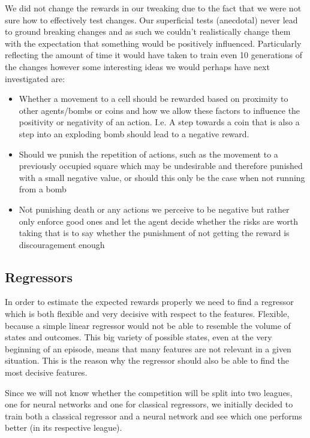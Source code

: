 	We did not change the rewards in our tweaking due to the fact that we were not sure how to effectively test changes. Our superficial tests (anecdotal) never lead to ground breaking changes and as such we couldn't realistically change them with the expectation that something would be positively influenced. Particularly reflecting the amount of time it would have taken to train even 10 generations of the changes however some interesting ideas we would perhaps have next investigated are:
	\begin{itemize}
		\item Whether a movement to a cell should be rewarded based on proximity to other agents/bombs or coins and how we allow these factors to influence the positivity or negativity of an action. I.e. A step towards a coin that is also a step into an exploding bomb should lead to a negative reward.
		\item Should we punish the repetition of actions, such as the movement to a previously occupied square which may be undesirable and therefore punished with a small negative value, or should this only be the case when not running from a bomb
		\item Not punishing death or any actions we perceive to be negative but rather only enforce good ones and let the agent decide whether the risks are worth taking that is to say whether the punishment of not getting the reward is discouragement enough
	\end{itemize}
	
	\subsection{Regressors}
	In order to estimate the expected rewards properly we need to find a regressor which is both flexible and very decisive with respect to the features. Flexible, because a simple linear regressor would not be able to resemble the volume of states and outcomes. This big variety of possible states, even at the very beginning of an episode, means that many features are not relevant in a given situation. This is the reason why the regressor should also be able to find the most decisive features.\par
	
	Since we will not know whether the competition will be split into two leagues, one for neural networks and one for classical regressors, we initially decided to train both a classical regressor and a neural network and see which one performs better (in its respective league).\par
	
